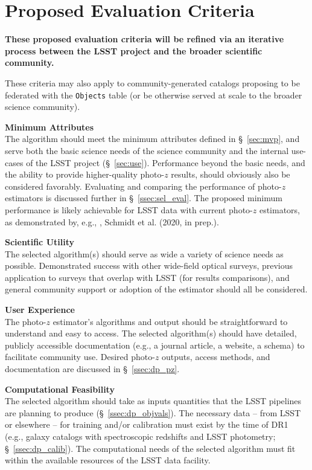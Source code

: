 \documentclass[DM,lsstdraft,toc]{lsstdoc}
\begin{document}
\section{Proposed Evaluation Criteria} \label{sec:sel}

\textbf{These proposed evaluation criteria will be refined via an iterative process between the LSST project and the broader scientific community.}

These criteria may also apply to community-generated catalogs proposing to be federated with the {\tt Objects} table (or be otherwise served at scale to the broader science community).

{\bf Minimum Attributes}\\
The algorithm should meet the minimum attributes defined in \S~\ref{sec:mvp}, and serve both the basic science needs of the science community and the internal use-cases of the LSST project (\S~\ref{sec:use}).
Performance beyond the basic needs, and the ability to provide higher-quality photo-$z$ results, should obviously also be considered favorably.
Evaluating and comparing the performance of photo-$z$ estimators is discussed further in \S~\ref{ssec:sel_eval}.
The proposed minimum performance is likely achievable for LSST data with current photo-$z$ estimators, as demonstrated by, e.g., \citet{2018AJ....155....1G}, Schmidt et al. (2020, in prep.).

{\bf Scientific Utility}\\
The selected algorithm(s) should serve as wide a variety of science needs as possible.
Demonstrated success with other wide-field optical surveys, previous application to surveys that overlap with LSST (for results comparisons), and general community support or adoption of the estimator should all be considered.

{\bf User Experience}\\
The photo-$z$ estimator's algorithms and output should be straightforward to understand and easy to access.
The selected algorithm(s) should have detailed, publicly accessible documentation (e.g., a journal article, a website, a schema) to facilitate community use.
Desired photo-$z$ outputs, access methods, and documentation are discussed in \S~\ref{ssec:dp_pz}.

{\bf Computational Feasibility}\\
The selected algorithm should take as inputs quantities that the LSST pipelines are planning to produce (\S~\ref{ssec:dp_objvals}).
The necessary data -- from LSST or elsewhere -- for training and/or calibration must exist by the time of DR1 (e.g., galaxy catalogs with spectroscopic redshifts and LSST photometry; \S~\ref{ssec:dp_calib}).
The computational needs of the selected algorithm must fit within the available resources of the LSST data facility.
\end{document}
